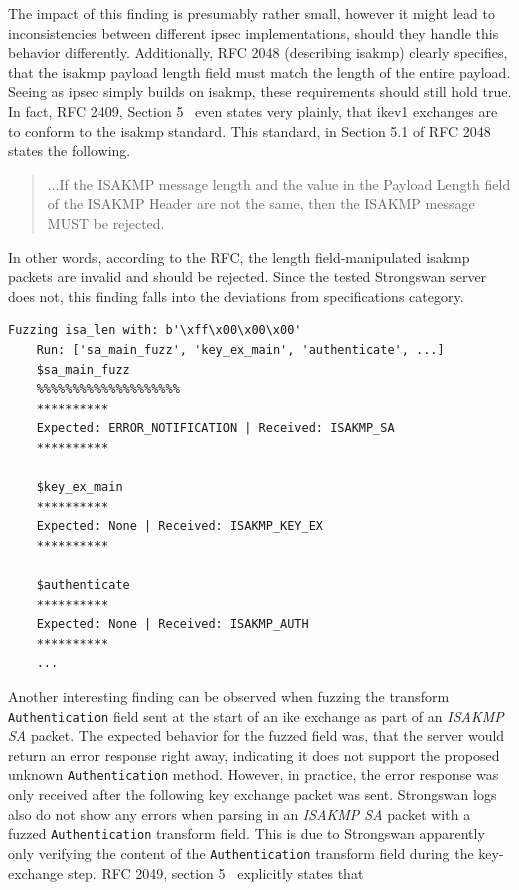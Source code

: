 The impact of this finding is presumably rather small, however it might lead to inconsistencies between different \ac{ipsec} implementations, should they handle this behavior differently. Additionally, RFC 2048 (describing \ac{isakmp}) clearly specifies, that the \ac{isakmp} payload length field must match the length of the entire payload. Seeing as \ac{ipsec} simply builds on \ac{isakmp}, these requirements should still hold true. In fact, RFC 2409, Section 5~\cite{rfc:ikev1} even states very plainly, that \ac{ike}v1 exchanges are to conform to the \ac{isakmp} standard.
This standard, in Section 5.1 of RFC 2048~\cite{rfc:isakmp} states the following. 

\begin{quotation}
	...If the ISAKMP message length and the value in
	the Payload Length field of the ISAKMP Header are not the same, then
	the ISAKMP message MUST be rejected.
\end{quotation}

In other words, according to the RFC, the length field-manipulated \ac{isakmp} packets are invalid and should be rejected. Since the tested Strongswan server does not, this finding falls into the deviations from specifications category.


\begin{lstlisting}[float=h, caption=Finding showing the ISAKMP length field being ignored, label=lst:finding_isalen]
	Fuzzing isa_len with: b'\xff\x00\x00\x00'
	Run: ['sa_main_fuzz', 'key_ex_main', 'authenticate', ...]
	$sa_main_fuzz
	%%%%%%%%%%%%%%%%%%%%
	**********
	Expected: ERROR_NOTIFICATION | Received: ISAKMP_SA
	**********
	
	$key_ex_main
	**********
	Expected: None | Received: ISAKMP_KEY_EX
	**********
	
	$authenticate
	**********
	Expected: None | Received: ISAKMP_AUTH
	**********
	...
\end{lstlisting}


Another interesting finding can be observed when fuzzing the transform \texttt{Authentication} field sent at the start of an \ac{ike} exchange as part of an \emph{ISAKMP SA} packet. The expected behavior for the fuzzed field was, that the server would return an error response right away, indicating it does not support the proposed unknown \texttt{Authentication} method. However, in practice, the error response was only received after the following key exchange packet was sent. Strongswan logs also do not show any errors when parsing in an \emph{ISAKMP SA} packet with a fuzzed \texttt{Authentication} transform field. This is due to Strongswan apparently only verifying the content of the \texttt{Authentication} transform field during the key-exchange step. RFC 2049, section 5~\cite{rfc:ikev1} explicitly states that 

